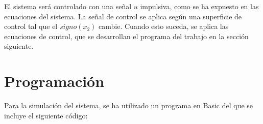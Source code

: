 \documentclass[DIV=20]{scrartcl}
\begin{document}
El sistema será controlado con una señal $u$ impulsiva, como se ha expuesto en
las ecuaciones del sistema. La señal de control se aplica según una superficie
de control tal que el $signo(x_2)$ cambie. Cuando esto suceda, se aplica las
ecuaciones de control, que se desarrollan el programa del trabajo en la sección siguiente.

\section{Programación}

Para la simulación del sistema, se ha utilizado un programa en Basic del que se
incluye el siguiente código:


\end{document}
